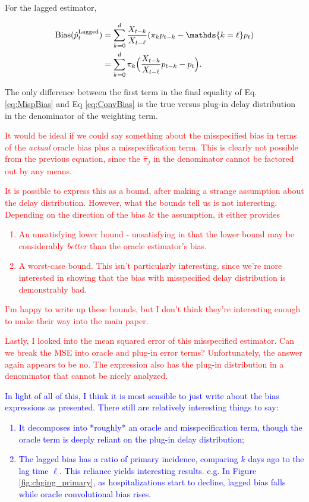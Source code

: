 \documentclass{article}
\begin{document}
For the lagged estimator,

\begin{align}\label{eq:LagBias}
    \text{Bias}(\hat{p}_t^\text{Lagged}) &=  \sum_{k=0}^d \frac{X_{t-k}}{X_{t-\ell}}(\pi_k p_{t-k}-\mathds\{k=\ell\} p_t) \nonumber \\
    &= \sum_{k=0}^d \pi_k \Big(\frac{X_{t-k}}{X_{t-\ell}} p_{t-k} - p_{t} \Big).
\end{align}

The only difference between the first term in the final equality of Eq. \ref{eq:MispBias} and Eq \ref{eq:ConvBias} is the true versus plug-in delay distribution in the denominator of the weighting term. 

\textcolor{red}{It would be ideal if we could say something about the misspecified bias in terms of the \textit{actual} oracle bias plus a misspecification term. This is clearly not possible from the previous equation, since the $\hat\pi_j$ in the denominator cannot be factored out by any means.}

\textcolor{red}{It is possible to express this as a bound, after making a strange assumption about the delay distribution. However, what the bounds tell us is not interesting. Depending on the direction of the bias \& the assumption, it either provides 
\begin{enumerate}
    \item An unsatisfying lower bound - unsatisfying in that the lower bound may be considerably \textit{better} than the oracle estimator's bias.
    \item A worst-case bound. This isn't particularly interesting, since we're more interested in showing that the bias with misspecified delay distribution is demonstrably bad.
\end{enumerate}
I'm happy to write up these bounds, but I don't think they're interesting enough to make their way into the main paper.}

\textcolor{red}{Lastly, I looked into the mean squared error of this misspecified estimator. Can we break the MSE into oracle and plug-in error terms? Unfortunately, the answer again appears to be no. The expression also has the plug-in distribution in a denominator that cannot be nicely analyzed.}

\textcolor{blue}{In light of all of this, I think it is most sensible to just write about the bias expressions as presented. There still are relatively interesting things to say:
\begin{enumerate}
    \item It decomposes into *roughly* an oracle and misspecification term, though the oracle term is deeply reliant on the plug-in delay distribution;
    \item The lagged bias has a ratio of primary incidence, comparing $k$ days ago to the lag time $\ell$. This reliance yields interesting results. e.g. In Figure \ref{fig:chging_primary}, as hospitalizations start to decline, lagged bias falls while oracle convolutional bias rises.
\end{enumerate}}
\end{document}
